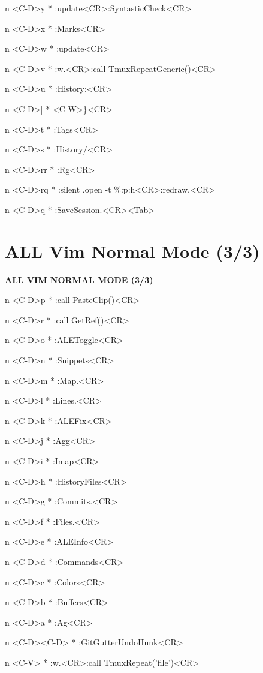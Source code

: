 \documentclass[11pt,a4paper,twoside]{book}
\begin{document}
n  <C-D>y  * :update<CR>:SyntasticCheck<CR>

n  <C-D>x  * :Marks<CR>

n  <C-D>w  * :update<CR>

n  <C-D>v  * :w.<CR>:call TmuxRepeatGeneric()<CR>

n  <C-D>u  * :History:<CR>

n  <C-D>]  * <C-W>\}<CR>

n  <C-D>t  * :Tags<CR>

n  <C-D>s  * :History/<CR>

n  <C-D>rr  * :Rg<CR>

n  <C-D>rq  * :silent .open -t \%:p:h<CR>:redraw.<CR>

n  <C-D>q  * :SaveSession.<CR><Tab>


\vspace{16pt}

\section{ALL Vim Normal Mode (3/3)}


\vspace{10pt}
{\large\bfseries\color{neoncyan} ALL VIM NORMAL MODE (3/3)}\vspace{6pt}

n  <C-D>p  * :call PasteClip()<CR>

n  <C-D>r  * :call GetRef()<CR>

n  <C-D>o  * :ALEToggle<CR>

n  <C-D>n  * :Snippets<CR>

n  <C-D>m  * :Map.<CR>

n  <C-D>l  * :Lines.<CR>

n  <C-D>k  * :ALEFix<CR>

n  <C-D>j  * :Agg<CR>

n  <C-D>i  * :Imap<CR>

n  <C-D>h  * :HistoryFiles<CR>

n  <C-D>g  * :Commits.<CR>

n  <C-D>f  * :Files.<CR>

n  <C-D>e  * :ALEInfo<CR>

n  <C-D>d  * :Commands<CR>

n  <C-D>c  * :Colors<CR>

n  <C-D>b  * :Buffers<CR>

n  <C-D>a  * :Ag<CR>

n  <C-D><C-D>  * :GitGutterUndoHunk<CR>

n  <C-V>  * :w.<CR>:call TmuxRepeat('file')<CR>
\end{document}

